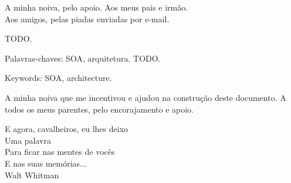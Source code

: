 \documentclass[a4paper,12pt]{monografia}
\begin{document}
%
  
%
\tecnologo {} 
%
 
\unidadeacademica{}
%
%
 
%
%
%
%
%
%
%
%
%
%
%
\maketitle
\begin{dedicatoria}
A minha noiva, pelo apoio.
Aos meus pais e irmão.\\
Aos amigos, pelas piadas enviadas por e-mail.\\
\end{dedicatoria}
 TODO.

\noindent Palavras-chaves: SOA, arquitetura.
 TODO.

\noindent Keywords: SOA, architecture.

\indent\indent A minha noiva que me incentivou e ajudou na construção deste documento.
A todos os meus parentes, pelo encorajamento e
apoio.

\newpage
\begin{epigrafe}
  E agora, cavalheiros, eu lhes deixo\\
  Uma palavra\\
  Para ficar nas mentes de vocês\\
  E nas suas memórias...\\
\hfill Walt Whitman
\end{epigrafe}
\tableofcontents \thispagestyle{empty} %
% 
\end{document}
